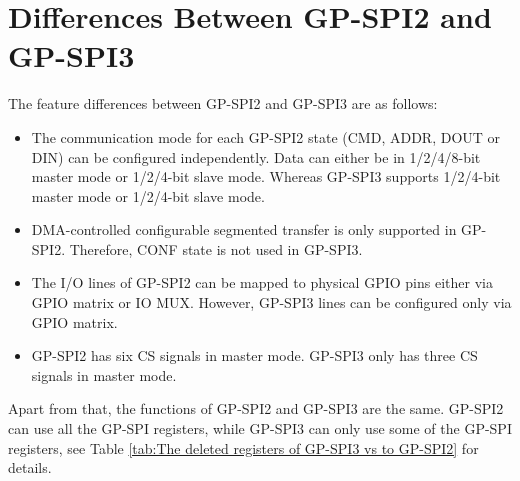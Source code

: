\documentclass[main\_\_EN.tex]{subfiles}
\begin{document}
\section{Differences Between GP-SPI2 and GP-SPI3}\label{Subsection:Differences Between GP-SPI2 and GP-SPI3}
The feature differences between GP-SPI2 and GP-SPI3 are as follows:
\begin{itemize}
    \item The communication mode for each GP-SPI2 state (CMD, ADDR, DOUT or DIN) can be configured independently. Data can either be in 1/2/4/8-bit master mode or 1/2/4-bit slave mode. Whereas GP-SPI3 supports 1/2/4-bit master mode or 1/2/4-bit slave mode.

    \item DMA-controlled configurable segmented transfer is only supported in GP-SPI2. Therefore, CONF state is not used in GP-SPI3.

    \item The I/O lines of GP-SPI2 can be mapped to physical GPIO pins either via GPIO matrix or IO MUX. However, GP-SPI3 lines can be configured only via GPIO matrix.

    \item GP-SPI2 has six CS signals in master mode. GP-SPI3 only has three CS signals in master mode.
\end{itemize}
Apart from that, the functions of GP-SPI2 and GP-SPI3 are the same. GP-SPI2 can use all the GP-SPI registers, while GP-SPI3 can only use some of the GP-SPI registers, see Table \ref{tab:The deleted registers of GP-SPI3 vs to GP-SPI2} for details.
\end{document}
